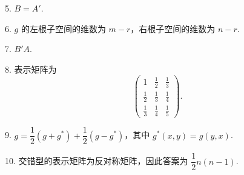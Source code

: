 \documentclass[UTF8, 12pt, fontset=fandol, oneside]{ctexart}
\begin{document}
5. $B=A'$.

6. $g$ 的左根子空间的维数为 $m-r$，右根子空间的维数为 $n-r$.

7. $B'A$.

8. 表示矩阵为
\[
\left(\begin{array}{ccc}
1 & \frac12 & \frac13\\
\frac12 & \frac13 & \frac14\\
\frac13 & \frac14 & \frac15
\end{array}\right).
\]

9. $g=\dfrac12(g+g^*)+\dfrac12(g-g^*)$，其中 $g^*(x,y)=g(y,x)$.

10. 交错型的表示矩阵为反对称矩阵，因此答案为 $\dfrac12 n(n-1)$.
\end{document}
